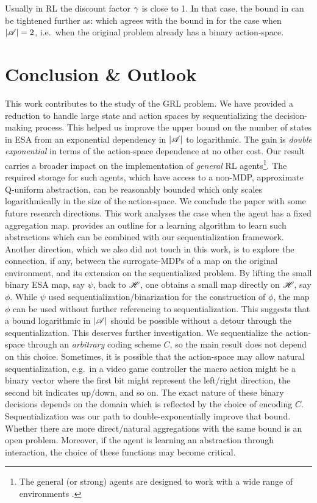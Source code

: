 \documentclass{article} %
\begin{document}
Usually in RL the discount factor $\gamma$ is close to 1. In that case, the bound in  can be tightened further as:
\beq
\abs{\S} \lesssim {}
\eeq
which agrees with the bound in  for the case when ${\left\lvert\mathscr{A}\right\rvert} = 2$, i.e.\ when the original problem already has a binary action-space.

\section{Conclusion \& Outlook}\label{sec:conclusion}

This work contributes to the study of the GRL problem. We have provided a reduction to handle large state and action spaces by sequentializing the decision-making process.
This helped us improve the upper bound on the number of states in ESA from an exponential dependency in ${\left\lvert\mathscr{A}\right\rvert}$ to logarithmic. The gain is \emph{double exponential} in terms of the action-space dependence at no other cost.  
Our result carries a broader impact on the implementation of \emph{general} RL agents\footnote{The general (or strong) agents are designed to work with a wide range of environments \cite{Hutter2000}.}. The required storage for such agents, which have access to a non-MDP, approximate Q-uniform abstraction, can be reasonably bounded which only scales logarithmically in the size of the action-space.  
We conclude the paper with some future research directions. This work analyses the case when the agent has a fixed aggregation map. \citet{Hutter2016} provides an outline for a learning algorithm to learn such abstractions which can be combined with our sequentialization framework.  
Another direction, which we also did not touch in this work, is to explore the connection, if any, between the surrogate-MDPs of a map on the original environment, and its extension on the sequentialized problem. By lifting the small binary ESA map, say $\psi$, back to $\mathscr{H}$, one obtains a small map directly on $\mathscr{H}$, say $\phi$. While $\psi$ used sequentialization/binarization for the construction of $\phi$, the map $\phi$ can be used without further referencing to sequentialization. This suggests that a bound logarithmic in ${\left\lvert\mathscr{A}\right\rvert}$ should be possible without a detour through the sequentialization. This deserves further investigation.  
We sequentialize the action-space through an \emph{arbitrary} coding scheme $C$, so the main result does not depend on this choice. Sometimes, it is possible that the action-space may allow natural sequentialization, e.g.\ in a video game controller the macro action might be a binary vector where the first bit might represent the left/right direction, the second bit indicates up/down, and so on. The exact nature of these binary decisions depends on the domain which is reflected by the choice of encoding $C$. Sequentialization was our path to double-exponentially improve that bound. Whether there are more direct/natural aggregations with the same bound is an open problem. Moreover, if the agent is learning an abstraction through interaction, the choice of these functions may become critical.  
\end{document}

